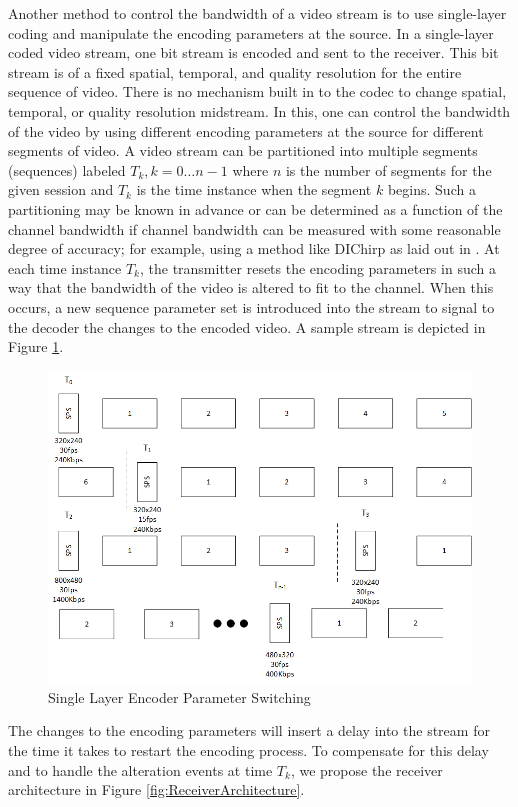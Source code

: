 \documentclass[3p,times,procedia]{elsarticle}
\begin{document}
Another method to control the bandwidth of a video stream is to use single-layer coding and manipulate the encoding parameters at the source. In a single-layer coded video stream, one bit stream is encoded and sent to the receiver. This bit stream is of a fixed spatial, temporal, and quality resolution for the entire sequence of video. There is no mechanism built in to the codec to change spatial, temporal, or quality resolution midstream. In this, one can control the bandwidth of the video by using different encoding parameters at the source for different segments of video. A video stream can be partitioned into multiple segments (sequences) labeled $T_k,k=0\ldots{n-1}$ where $n$ is the number of segments for the given session and $T_k$ is the time instance when the segment $k$ begins. Such a partitioning may be known in advance or can be determined as a function of the channel bandwidth if channel bandwidth can be measured with some reasonable degree of accuracy; for example, using a method like DIChirp as laid out in \cite{DIChirp}. At each time instance $T_k$, the transmitter resets the encoding parameters in such a way that the bandwidth of the video is altered to fit to the channel. When this occurs, a new sequence parameter set is introduced into the stream to signal to the decoder the changes to the encoded video. A sample stream is depicted in Figure \ref{fig:SingleLayerSwitching}.
\begin{figure}[ht]
\centering
\includegraphics[width=0.75\linewidth]{SingleLayerParameterSwitching.png}
\caption{Single Layer Encoder Parameter Switching}
\label{fig:SingleLayerSwitching}
\end{figure}
The changes to the encoding parameters will insert a delay into the stream for the time it takes to restart the encoding process. To compensate for this delay and to handle the alteration events at time $T_k$, we propose the receiver architecture in Figure \ref{fig:ReceiverArchitecture}.
\end{document}
